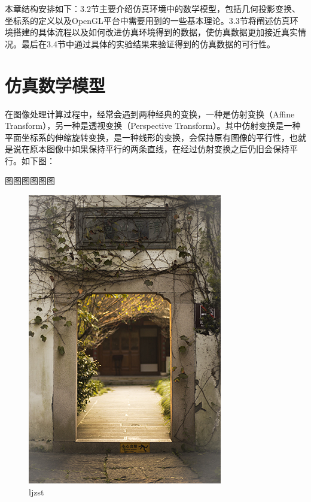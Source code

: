 本章结构安排如下：3.2节主要介绍仿真环境中的数学模型，包括几何投影变换、坐标系的定义以及OpenGL平台中需要用到的一些基本理论。3.3节将阐述仿真环境搭建的具体流程以及如何改进仿真环境得到的数据，使仿真数据更加接近真实情况。最后在3.4节中通过具体的实验结果来验证得到的仿真数据的可行性。


\section{仿真数学模型}
在图像处理计算过程中，经常会遇到两种经典的变换，一种是仿射变换（Affine Transform），另一种是透视变换（Perspective Transform）。其中仿射变换是一种平面坐标系的伸缩旋转变换，是一种线形的变换，会保持原有图像的平行性，也就是说在原本图像中如果保持平行的两条直线，在经过仿射变换之后仍旧会保持平行。如下图：

图图图图图图
\begin{figure}[htb]
	\centering 
	\includegraphics[scale=1.0]{./Pictures/test.jpg} 
	\caption{ljzst} 
\end{figure}

